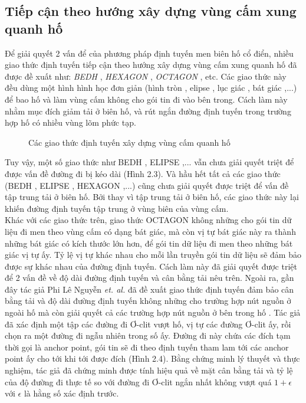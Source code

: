 \documentclass[12pt]{report}
\begin{document}
\subsection{Tiếp cận theo hướng xây dựng vùng cấm xung quanh hố}
Để giải quyết 2 vấn để của phương pháp định tuyến men biên hố cổ điển, nhiều giao thức định tuyến tiếp cận theo hướng xây dựng vùng cấm xung quanh hố đã được đề xuất như:  \textit{BEDH} \cite{bedh}, \textit{HEXAGON} \cite{hexagon}, \textit{OCTAGON} \cite{octagon}, etc. Các giao thức này đều dùng một hình hình học đơn giản (hình tròn \cite{bedh}, elipse \cite{elipse}, lục giác \cite{hexagon}, bát giác \cite{octagon},...) để bao hố và làm vùng cấm không cho gói tin đi vào bên trong. Cách làm này nhằm mục đích giảm tải ở biên hố, và rút ngắn đường định tuyến trong trường hợp hố có nhiều vùng lõm phức tạp.
\begin{figure}[H]
\centering
{}
\qquad
{}
\caption{Các giao thức định tuyến xây dựng vùng cấm quanh hố}
\label{fig:globfig}
\end{figure}
Tuy vậy, một số giao thức như BEDH \cite{bedh}, ELIPSE \cite{elipse},... vẫn chưa giải quyết triệt để được vấn đề đường đi bị kéo dài (Hình 2.3). Và hầu hết tất cả các giao thức (BEDH \cite{bedh}, ELIPSE \cite{elipse}, HEXAGON \cite{hexagon},...) cũng chưa giải quyết được triệt để vấn đề tập trung tải ở biên hố. Bởi thay vì tập trung tải ở biên hố, các giao thức này lại khiến đường định tuyến tập trung ở vùng biên của vùng cấm.\\
Khác với các giao thức trên, giao thức OCTAGON \cite{octagon} không những cho gói tin dữ liệu đi men theo vùng cấm có dạng bát giác, mà còn vị tự bát giác này ra thành những bát giác có kích thước lớn hơn, để gói tin dữ liệu đi men theo những bát giác vị tự ấy. Tỷ lệ vị tự khác nhau cho mỗi lần truyền gói tin dữ liệu sẽ đảm bảo được sự khác nhau của đường định tuyến. Cách làm này đã giải quyết được triệt để 2 vấn đề về độ dài đường định tuyến và cân bằng tải nêu trên.
Ngoài ra, gần đây tác giả Phi Lê Nguyễn \textit{et. al.} đã đề xuất giao thức định tuyến đảm bảo cân bằng tải và độ dài đường định tuyến không những cho trường hợp nút nguồn ở ngoài hố mà còn giải quyết cả các trường hợp nút nguồn ở bên trong hố \cite{bsmh}. Tác giả đã xác định một tập các đường đi Ơ-clit vượt hố, vị tự các đường Ơ-clit ấy, rồi chọn ra một đường đi ngẫu nhiên trong số ấy. Đường đi này chứa các đích tạm thời gọi là anchor point, gói tin sẽ đi theo định tuyến tham lam tới các anchor point ấy cho tới khi tới được đích (Hình 2.4). Bằng chứng minh lý thuyết và thực nghiệm, tác giả đã chứng minh được tính hiệu quả về mặt cân bằng tải và tỷ lệ của độ đường đi thực tế so với đường đi Ơ-clit ngắn nhất không vượt quá $1 + \epsilon$ với $\epsilon$ là hằng số xác định trước.\\
\end{document}
